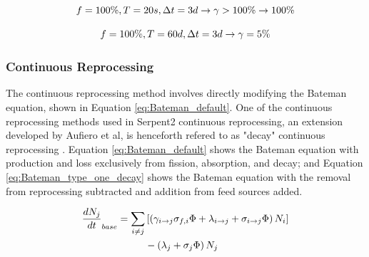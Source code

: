 \begin{equation} \hfill
f = 100\%, T = 20 s, \Delta t = 3 d \rightarrow \gamma > 100\% \rightarrow 100\%
\hfill\label{eq:SP_20s} \end{equation}

\begin{equation} \hfill
f = 100\%, T = 60 d, \Delta t = 3 d \rightarrow \gamma = 5\%
\hfill\label{eq:SP_60d} \end{equation}

\subsubsection{Continuous Reprocessing}

The continuous reprocessing method involves directly modifying the Bateman equation, shown in Equation \eqref{eq:Bateman_default}. One of the continuous reprocessing methods used in Serpent2 continuous reprocessing, an extension developed by Aufiero et al, is henceforth refered to as "decay" continuous reprocessing \cite{aufiero_extended_2013}. Equation \eqref{eq:Bateman_default} shows the Bateman equation with production and loss exclusively from fission, absorption, and decay; and Equation \eqref{eq:Bateman_type_one_decay} shows the Bateman equation with the removal from reprocessing subtracted and addition from feed sources added.

\begin{equation} \hfill
\begin{split}
\frac{dN_j}{dt}_{base} = \sum_{i \neq j}  & \left [ \left( \gamma_{i \rightarrow j} \sigma_{f, i} \Phi + \lambda _{i \rightarrow j} + \sigma_{i \rightarrow j} \Phi \right) N_i \right ]\\
 & - \left ( \lambda_j + \sigma_j \Phi \right ) N_j
\end{split}
\hfill\label{eq:Bateman_default} \end{equation}

